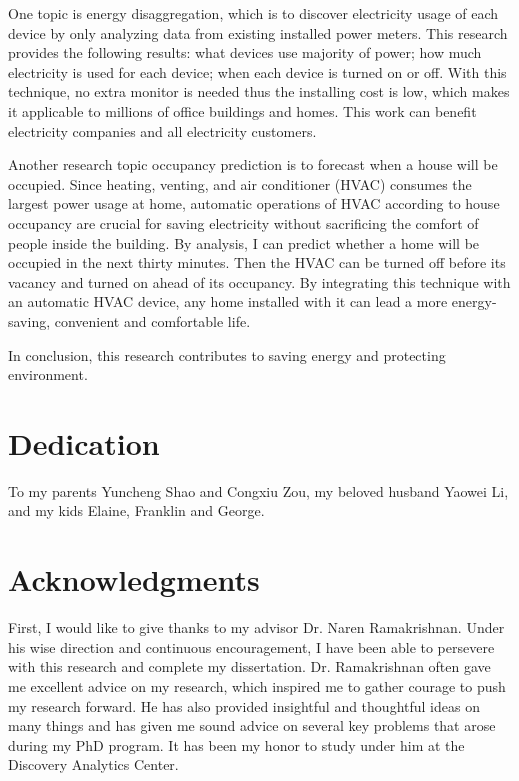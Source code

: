 \documentclass[12pt,pdf]{report}
\begin{document}
One topic is energy disaggregation, which is to discover electricity usage of each device by only analyzing data from existing installed power meters. This research provides the following results: what devices use majority of power; how much electricity is used for each device; when each device is turned on or off.  With this technique, no extra monitor is needed thus the installing cost is low, which makes it applicable to millions of office buildings and homes. This work can benefit electricity companies and all electricity customers. 

Another research topic occupancy prediction is to forecast when a house will be occupied. Since heating, venting, and air conditioner (HVAC) consumes the largest power usage at home, automatic operations of HVAC according to house occupancy are crucial for saving electricity without sacrificing the comfort of people inside the building. By analysis, I can predict whether a home will be occupied in the next thirty minutes. Then the HVAC can be turned off before its vacancy and turned on ahead of its occupancy. By integrating this technique with an automatic HVAC device, any home installed with it can lead a more energy-saving, convenient and comfortable life. 

In conclusion, this research contributes to saving energy and protecting environment. 
\vfill

\pagebreak
{}
\chapter*{Dedication}
To my parents Yuncheng Shao and Congxiu Zou, my beloved husband Yaowei Li, and my kids Elaine, Franklin and George.

\chapter*{Acknowledgments}
First, I would like to give thanks to my advisor Dr. Naren Ramakrishnan. 
Under his wise direction and continuous encouragement, 
I have been able to persevere with this research and complete my dissertation. 
Dr. Ramakrishnan often gave me excellent advice on my research, 
which inspired me to gather courage to push my research forward. 
He has also provided insightful and thoughtful ideas on many things and 
has given me sound advice on several key problems 
that arose during my PhD program. 
It has been my honor to study under him at the Discovery Analytics Center. 
\end{document}
